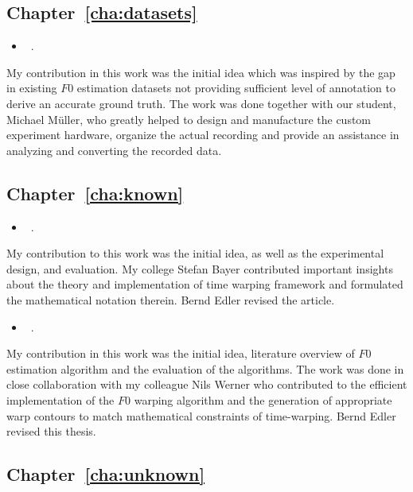\subsection*{Chapter~\ref{cha:datasets}}

\begin{itemize}
  \item[\cite{stoeter15acm}] ~.
\end{itemize}
\noindent
My contribution in this work was the initial idea which was inspired by the gap in existing $F0$ estimation datasets not providing sufficient level of annotation to derive an accurate ground truth.
The work was done together with our student, Michael Müller, who greatly helped to design and manufacture the custom experiment hardware, organize the actual recording and provide an assistance in analyzing and converting the recorded data.

\subsection*{Chapter~\ref{cha:known}}

\begin{itemize}
  \item[\cite{stoeter14}] ~.
\end{itemize}
\noindent
My contribution to this work was the initial idea, as well as the experimental design, and evaluation.
My college Stefan Bayer contributed important insights about the theory and implementation of time warping framework and formulated the mathematical notation therein. Bernd Edler revised the article.

\begin{itemize}
  \item[\cite{stoeter15icassp}] ~.
\end{itemize}
\noindent
My contribution in this work was the initial idea, literature overview of $F0$ estimation algorithm and the evaluation of the algorithms.
The work was done in close collaboration with my colleague Nils Werner who contributed to the efficient implementation of the $F0$ warping algorithm and the generation of appropriate warp contours to match mathematical constraints of time-warping. Bernd Edler revised this thesis.

\subsection*{Chapter~\ref{cha:unknown}}

